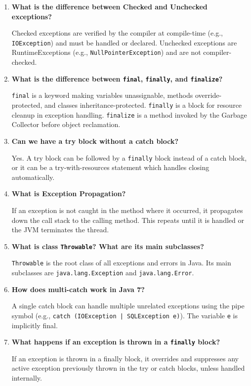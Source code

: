\documentclass[12pt,a4paper]{article}
\newcommand{\Q}[1]{\textbf{#1}\par\noindent\ignorespaces}
\begin{document}
\begin{tcolorbox}[exambox, title={\textbf{Frequently Asked / Viva Questions}}]
\begin{enumerate}[leftmargin=*, label=\textbf{Q\arabic*.}, itemsep=5pt]
  \item \Q{What is the difference between Checked and Unchecked exceptions?}
        Checked exceptions are verified by the compiler at compile-time (e.g., \texttt{IOException}) and must be handled or declared. Unchecked exceptions are RuntimeExceptions (e.g., \texttt{NullPointerException}) and are not compiler-checked.
        
  \item \Q{What is the difference between \texttt{final}, \texttt{finally}, and \texttt{finalize}?}
        \texttt{final} is a keyword making variables unassignable, methods override-protected, and classes inheritance-protected. \texttt{finally} is a block for resource cleanup in exception handling. \texttt{finalize} is a method invoked by the Garbage Collector before object reclamation.
        
  \item \Q{Can we have a try block without a catch block?}
        Yes. A try block can be followed by a \texttt{finally} block instead of a catch block, or it can be a try-with-resources statement which handles closing automatically.
        
  \item \Q{What is Exception Propagation?}
        If an exception is not caught in the method where it occurred, it propagates down the call stack to the calling method. This repeats until it is handled or the JVM terminates the thread.
        
  \item \Q{What is class \texttt{Throwable}? What are its main subclasses?}
        \texttt{Throwable} is the root class of all exceptions and errors in Java. Its main subclasses are \texttt{java.lang.Exception} and \texttt{java.lang.Error}.
        
  \item \Q{How does multi-catch work in Java 7?}
        A single catch block can handle multiple unrelated exceptions using the pipe symbol (e.g., \texttt{catch (IOException | SQLException e)}). The variable \texttt{e} is implicitly final.
        
  \item \Q{What happens if an exception is thrown in a \texttt{finally} block?}
        If an exception is thrown in a finally block, it overrides and suppresses any active exception previously thrown in the try or catch blocks, unless handled internally.
        

\end{enumerate}
\end{tcolorbox}
\end{document}
